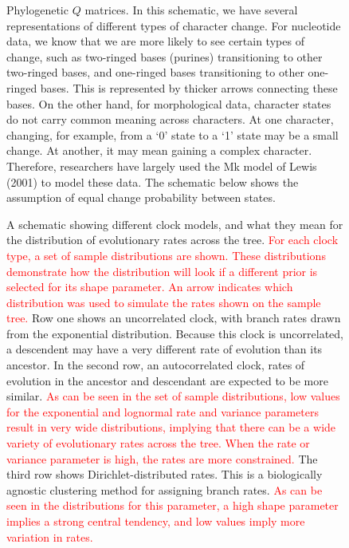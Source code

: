 \documentclass{cup-elements}
\newcommand{\rev}[1]{{\textcolor{red}{#1}}} %
\begin{document}
\begin{figure}[h!]
\centering
\caption{Phylogenetic $Q$ matrices.
In this schematic, we have several representations of different types of character change.
For nucleotide data, we know that we are more likely to see certain types of change, such as two-ringed bases (purines) transitioning to other two-ringed bases, and one-ringed bases transitioning to other one-ringed bases.
This is represented by thicker arrows connecting these bases.
On the other hand, for morphological data, character states do not carry common meaning across characters.
At one character, changing, for example, from a `0' state to a `1' state may be a small change.
At another, it may mean gaining a complex character.
Therefore, researchers have largely used the Mk model of Lewis (2001) to model these data.
The schematic below shows the assumption of equal change probability between states.
}
\label{fig:Q}
\end{figure}

\begin{figure}[h!]
\centering
\caption{A schematic showing different clock models, and what they mean for the distribution of evolutionary rates across the tree. \rev{For each clock type, a set of sample distributions are shown. These distributions demonstrate how the distribution will look if a different prior is selected for its shape parameter. An arrow indicates which distribution was used to simulate the rates shown on the sample tree.} Row one shows an uncorrelated clock, with branch rates drawn from the exponential distribution. Because this clock is uncorrelated, a descendent may have a very different rate of evolution than its ancestor.  In the second row, an autocorrelated clock, rates of evolution in the ancestor and descendant are expected to be more similar. \rev{As can be seen in the set of sample distributions, low values for the exponential and lognormal rate and variance parameters result in very wide distributions, implying that there can be a wide variety of evolutionary rates across the tree. When the rate or variance parameter is high, the rates are more constrained.} The third row shows Dirichlet-distributed rates. This is a biologically agnostic clustering method for assigning branch rates. \rev{As can be seen in the distributions for this parameter, a high shape parameter implies a strong central tendency, and low values imply more variation in rates.}
}
\label{fig:distn}
\end{figure}
\end{document}
